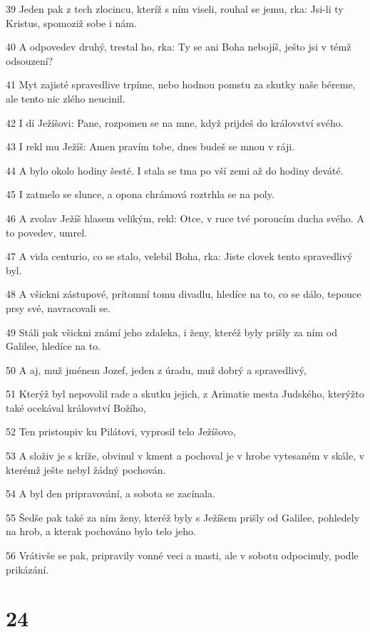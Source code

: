 \par 39 Jeden pak z tech zlocincu, kteríž s ním viseli, rouhal se jemu, rka: Jsi-li ty Kristus, spomoziž sobe i nám.
\par 40 A odpovedev druhý, trestal ho, rka: Ty se ani Boha nebojíš, ješto jsi v témž odsouzení?
\par 41 Myt zajisté spravedlive trpíme, nebo hodnou pomstu za skutky naše béreme, ale tento nic zlého neucinil.
\par 42 I dí Ježíšovi: Pane, rozpomen se na mne, když prijdeš do království svého.
\par 43 I rekl mu Ježíš: Amen pravím tobe, dnes budeš se mnou v ráji.
\par 44 A bylo okolo hodiny šesté. I stala se tma po vší zemi až do hodiny deváté.
\par 45 I zatmelo se slunce, a opona chrámová roztrhla se na poly.
\par 46 A zvolav Ježíš hlasem velikým, rekl: Otce, v ruce tvé poroucím ducha svého. A to povedev, umrel.
\par 47 A vida centurio, co se stalo, velebil Boha, rka: Jiste clovek tento spravedlivý byl.
\par 48 A všickni zástupové, prítomní tomu divadlu, hledíce na to, co se dálo, tepouce prsy své, navracovali se.
\par 49 Stáli pak všickni známí jeho zdaleka, i ženy, kteréž byly prišly za ním od Galilee, hledíce na to.
\par 50 A aj, muž jménem Jozef, jeden z úradu, muž dobrý a spravedlivý,
\par 51 Kterýž byl nepovolil rade a skutku jejich, z Arimatie mesta Judského, kterýžto také ocekával království Božího,
\par 52 Ten pristoupiv ku Pilátovi, vyprosil telo Ježíšovo,
\par 53 A složiv je s kríže, obvinul v kment a pochoval je v hrobe vytesaném v skále, v kterémž ješte nebyl žádný pochován.
\par 54 A byl den pripravování, a sobota se zacínala.
\par 55 Šedše pak také za ním ženy, kteréž byly s Ježíšem prišly od Galilee, pohledely na hrob, a kterak pochováno bylo telo jeho.
\par 56 Vrátivše se pak, pripravily vonné veci a masti, ale v sobotu odpocinuly, podle prikázání.

\chapter{24}

